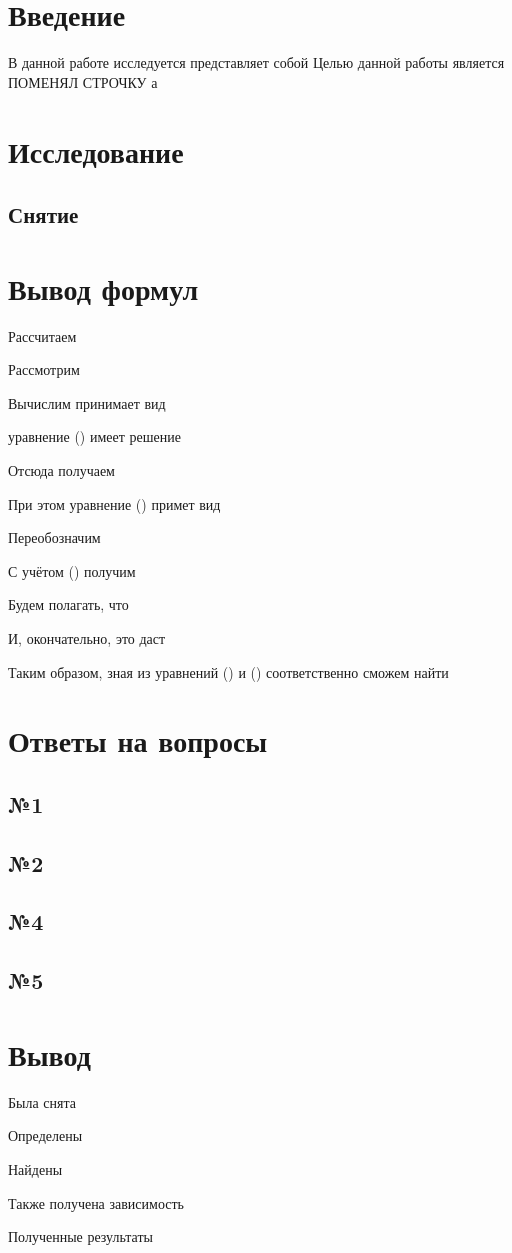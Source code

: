 



\def\labauthors{Понур К.А., Сарафанов Ф.Г., Сидоров Д.А.}
\def\labgroup{420}
\def\labnumber{000}
\def\labtheme{Эффект Холла}



\tableofcontents
\newpage

\section*{Введение}
\label{sec:input}

В данной работе исследуется 
представляет собой
Целью данной работы является 
ПОМЕНЯЛ СТРОЧКУ а

\newpage
\section{Исследование}
\subsection{Снятие}


\newpage
\section{Вывод формул}
Рассчитаем 

Рассмотрим 

Вычислим
принимает вид

уравнение () имеет решение

Отсюда получаем

При этом уравнение () примет вид

Переобозначим 

С учётом () получим

Будем полагать, что 

И, окончательно, это даст 


Таким образом, зная из уравнений () и () соответственно сможем найти 

\newpage
\section{Ответы на вопросы}

\subsection{№1}
\subsection{№2}
\subsection{№4}
\subsection{№5}


\newpage
\section{Вывод}

Была снята 

Определены 

Найдены 

Также получена зависимость 

Полученные результаты  



